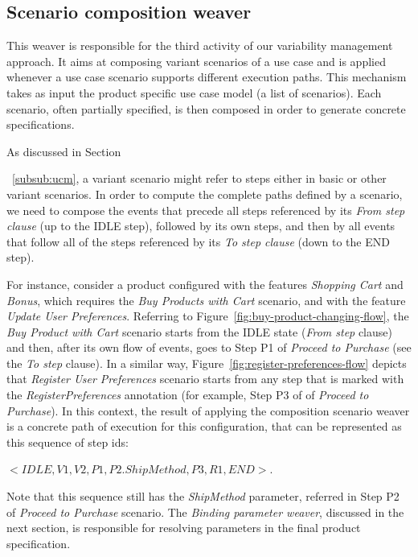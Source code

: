 \documentclass{report}
\begin{document}
\begin{frontmatter}

\subsection{Scenario composition weaver}\label{sub:sc-weaver}

This weaver is responsible for the third activity of our variability management 
approach. It aims at composing variant scenarios of a use case and is applied whenever a use case scenario supports different execution paths.
This mechanism takes as input the product specific use case model (a list of scenarios). Each scenario, often partially specified, is then composed in order to generate concrete specifications.

As discussed in Section{~\ref{subsub:ucm}, a variant scenario 
might refer to steps either in basic or other variant scenarios. In order
to compute the complete paths defined by a scenario, we need to compose the events that precede all steps referenced by its \emph{From step
clause} (up to the IDLE step), followed by its own steps, and then by all
events that follow all of the steps referenced by its \emph{To step clause} (down to the END step). 

For instance, consider a product configured with the features \emph{Shopping Cart} and \emph{Bonus}, which requires the \emph{Buy Products with Cart} scenario, and with the feature \emph{Update User Preferences}. Referring to Figure~\ref{fig:buy-product-changing-flow}, the  \emph{Buy Product with Cart} scenario starts from the IDLE state (\emph{From step} clause) and then, after its own flow of events, goes to Step P1 of \emph{Proceed to Purchase} (see the \emph{To step} clause). In a similar way, Figure~\ref{fig:register-preferences-flow} depicts that \emph{Register User Preferences} scenario starts from any step that is marked with the \emph{RegisterPreferences} annotation (for example, Step P3 of of \emph{Proceed to Purchase}). In this context, the result of applying the composition scenario weaver is a concrete path of execution for this configuration, that can be represented as this sequence of step ids: 

\begin{center}
\begin{small}
\mbox{$<IDLE, V1, V2, P1, P2.ShipMethod, P3, R1, END>$}.
\end{small}
\end{center}

Note that this sequence still has  the \emph{ShipMethod} parameter, 
referred in Step P2 of \emph{Proceed to Purchase} scenario. The \emph{Binding parameter weaver}, discussed in the next section, is responsible for resolving parameters in the final 
product specification.  

}
\end{frontmatter}
\end{document}
